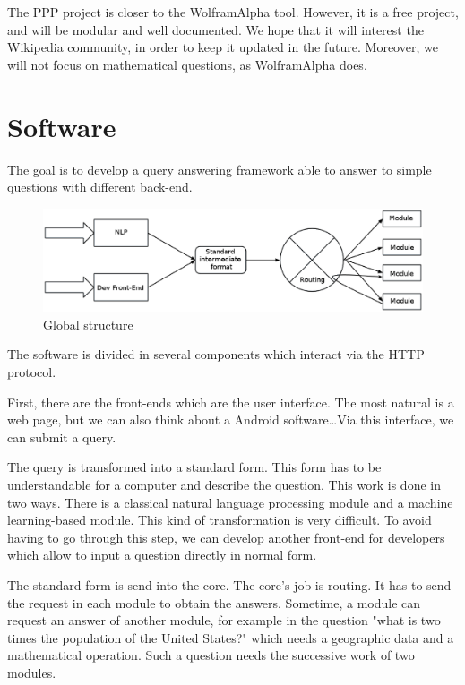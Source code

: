 \documentclass[a4paper,10pt]{article}
\begin{document}
The PPP project is closer to the WolframAlpha tool. However, it is a free project,
and will be modular and well documented. We hope that it will interest the 
Wikipedia community, in order to keep it updated in the future. Moreover,
we will not focus on mathematical questions, as WolframAlpha does.

\section{Software}

The goal is to develop a query answering framework able to answer to simple questions with different back-end. 

\begin{figure}[!h]
    \centering
    \includegraphics[scale=0.39]{images/Structure-PPP-en.eps}
    \caption{Global structure}
\end{figure}

The software is divided in several components which interact via the HTTP protocol.

First, there are the front-ends which are the user interface. The most natural is a web page, but we can also think about a Android software\ldots Via this interface, we can submit a query.

The query is transformed into a standard form. This form has to be understandable for a computer and describe the question. This work is done in two ways. There is a classical natural language processing module and a machine learning-based module. This kind of transformation is very difficult. To avoid having to go through this step, we can develop another front-end for developers which allow to input a question directly in normal form.

The standard form is send into the core. The core's job is routing. It has to send the request in each module to obtain the answers. Sometime, a module can request an answer of another module, for example in the question "what is two times the population of the United States?" which needs a geographic data and a mathematical operation. Such a question needs the successive work of two modules.
\end{document}
